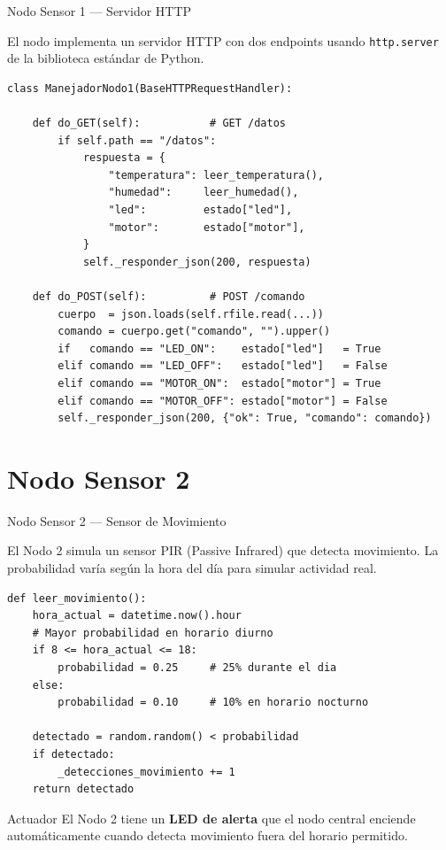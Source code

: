 \documentclass[aspectratio=169]{beamer}
\begin{document}
\begin{frame}[fragile]{Nodo Sensor 1 --- Servidor HTTP}

El nodo implementa un servidor HTTP con dos endpoints usando \texttt{http.server}
de la biblioteca est\'andar de Python.

\vspace{0.3em}
\begin{lstlisting}
class ManejadorNodo1(BaseHTTPRequestHandler):

    def do_GET(self):           # GET /datos
        if self.path == "/datos":
            respuesta = {
                "temperatura": leer_temperatura(),
                "humedad":     leer_humedad(),
                "led":         estado["led"],
                "motor":       estado["motor"],
            }
            self._responder_json(200, respuesta)

    def do_POST(self):          # POST /comando
        cuerpo  = json.loads(self.rfile.read(...))
        comando = cuerpo.get("comando", "").upper()
        if   comando == "LED_ON":    estado["led"]   = True
        elif comando == "LED_OFF":   estado["led"]   = False
        elif comando == "MOTOR_ON":  estado["motor"] = True
        elif comando == "MOTOR_OFF": estado["motor"] = False
        self._responder_json(200, {"ok": True, "comando": comando})
\end{lstlisting}
\end{frame}

\section{Nodo Sensor 2}

\begin{frame}[fragile]{Nodo Sensor 2 --- Sensor de Movimiento}

El Nodo 2 simula un sensor PIR (Passive Infrared) que detecta movimiento.
La probabilidad var\'ia seg\'un la hora del d\'ia para simular actividad real.

\vspace{0.3em}
\begin{lstlisting}
def leer_movimiento():
    hora_actual = datetime.now().hour
    # Mayor probabilidad en horario diurno
    if 8 <= hora_actual <= 18:
        probabilidad = 0.25     # 25% durante el dia
    else:
        probabilidad = 0.10     # 10% en horario nocturno

    detectado = random.random() < probabilidad
    if detectado:
        _detecciones_movimiento += 1
    return detectado
\end{lstlisting}

\vspace{0.3em}
\begin{block}{Actuador}
El Nodo 2 tiene un \textbf{LED de alerta} que el nodo central enciende
autom\'aticamente cuando detecta movimiento fuera del horario permitido.
\end{block}
\end{frame}
\end{document}
